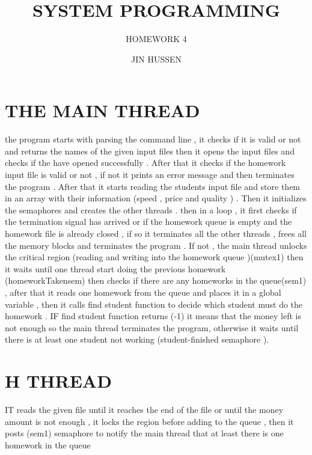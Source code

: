 \documentclass{article}
\title{SYSTEM PROGRAMMING }
\author{HOMEWORK 4  }
\date{JIN HUSSEN}
\begin{document}
\maketitle

\section{THE MAIN THREAD }
the program starts with parsing the command line , it checks if it is valid or not and returns the names of the given input files then it opens the input files and checks if the have opened successfully .
After that it checks if the homework input file is valid or not , if not it prints an error message and then terminates the program .
After that it starts reading the students input file and store them in an array with their information (speed , price and quality ) .
Then it initializes the semaphores and creates the other threads .
then in a loop , it first checks if the termination signal has arrived or if the homework queue is empty  and the homework file is already closed , if so it terminates all the other threads , frees all the memory blocks and terminates the program .
If not , the main thread unlocks the critical region (reading and writing into the homework queue )(mutex1) then it waits until one thread start doing the previous homework (homeworkTakensem)
then checks if there are any homeworks in the queue(sem1) , after that it reads one homework from the queue and places it in a global variable , then it calls find student function to decide which student must do the homework . IF find student function returns (-1) 
it means that the money left is not enough so the main thread terminates the program, otherwise it waits until there is at least one student not working (student-finished semaphore ). 

\maketitle

\section{H THREAD }
IT reads the given file until it reaches the end of the file or until the money amount is not enough , it locks the region before adding to the queue , then it posts (sem1) semaphore to notify the main thread that at least there is one homework in the queue
\end{document}
